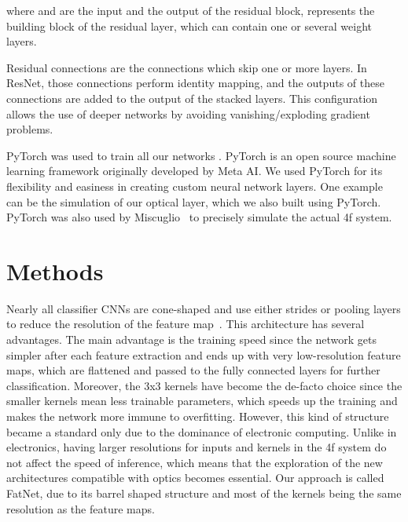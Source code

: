\documentclass{article}
\begin{document}
where  and  are the input and the output of the residual block,  represents the building block of the residual layer, which can contain one or several weight layers. 

Residual connections are the connections which skip one or more layers. In ResNet, those connections perform identity mapping, and the outputs of these connections are added to the output of the stacked layers. This configuration allows the use of deeper networks by avoiding vanishing/exploding gradient problems. 

PyTorch was used to train all our networks \cite{paszke_pytorch_2019}. PyTorch is an open source machine learning framework originally developed by Meta AI. We used PyTorch for its flexibility and easiness in creating custom neural network layers. One example can be the simulation of our optical layer, which we also built using PyTorch. PyTorch was also used by Miscuglio~\cite{miscuglio_massively_2020} to precisely simulate the actual 4f system.  


\section{Methods}
Nearly all classifier CNNs are cone-shaped and use either strides or pooling layers to reduce the resolution of the feature map~\cite{peng_large_2017}. This architecture has several advantages. The main advantage is the training speed since the network gets simpler after each feature extraction and ends up with very low-resolution feature maps, which are flattened and passed to the fully connected layers for further classification. Moreover, the 3x3 kernels have become the de-facto choice since the smaller kernels mean less trainable parameters, which speeds up the training and makes the network more immune to overfitting. However, this kind of structure became a standard only due to the dominance of electronic computing. Unlike in electronics, having larger resolutions for inputs and kernels in the 4f system do not affect the speed of inference, which means that the exploration of the new architectures compatible with optics becomes essential. Our approach is called FatNet, due to its barrel shaped structure and most of the kernels being the same resolution as the feature maps.
\end{document}
